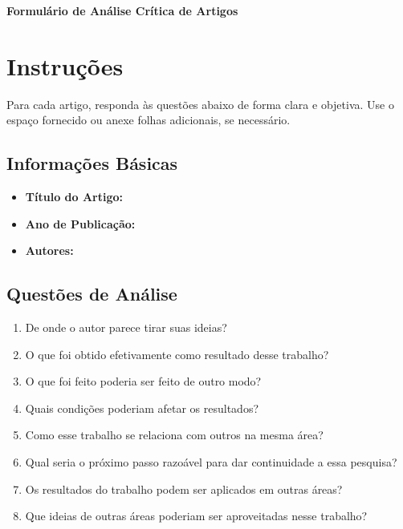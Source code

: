 \documentclass[a4paper,12pt]{article}
\begin{document}
\begin{center}
    \Large \textbf{Formulário de Análise Crítica de Artigos}
\end{center}

\vspace{0.5cm}

\section*{Instruções}
Para cada artigo, responda às questões abaixo de forma clara e objetiva. Use o espaço fornecido ou anexe folhas adicionais, se necessário.

\subsection*{Informações Básicas}
\begin{itemize}
    \item \textbf{Título do Artigo:} 
    \item \textbf{Ano de Publicação:} 
    \item \textbf{Autores:}
\end{itemize}

\subsection*{Questões de Análise}
\begin{enumerate}[label=\arabic*.]
    \item De onde o autor parece tirar suas ideias? 
    \item O que foi obtido efetivamente como resultado desse trabalho? 
    \item O que foi feito poderia ser feito de outro modo? 
    \item Quais condições poderiam afetar os resultados? 
    \item Como esse trabalho se relaciona com outros na mesma área? 
    \item Qual seria o próximo passo razoável para dar continuidade a essa pesquisa? 
    \item Os resultados do trabalho podem ser aplicados em outras áreas? 
    \item Que ideias de outras áreas poderiam ser aproveitadas nesse trabalho? 
    
\end{enumerate}
\end{document}
